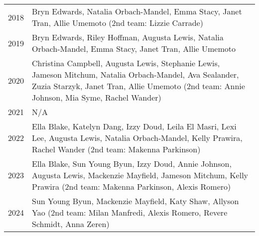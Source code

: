 \begin{longtable}{c p{}}
2018 & Bryn Edwards, Natalia Orbach-Mandel, Emma Stacy, Janet Tran, Allie Umemoto (2nd team: Lizzie Carrade) \\
2019 & Bryn Edwards, Riley Hoffman, Augusta Lewis, Natalia Orbach-Mandel, Emma Stacy, Janet Tran, Allie Umemoto \\
2020 & Christina Campbell, Augusta Lewis, Stephanie Lewis, Jameson Mitchum, Natalia Orbach-Mandel, Ava Sealander, Zuzia Starzyk, Janet Tran, Allie Umemoto (2nd team: Annie Johnson, Mia Syme, Rachel Wander) \\
2021 & N/A \\
2022 & Ella Blake, Katelyn Dang, Izzy Doud, Leila El Masri, Lexi Lee, Augusta Lewis, Natalia Orbach-Mandel, Kelly Prawira, Rachel Wander (2nd team: Makenna Parkinson) \\
2023 & Ella Blake, Sun Young Byun, Izzy Doud, Annie Johnson, Augusta Lewis, Mackenzie Mayfield, Jameson Mitchum, Kelly Prawira (2nd team: Makenna Parkinson, Alexis Romero) \\
2024 & Sun Young Byun, Mackenzie Mayfield, Katy Shaw, Allyson Yao (2nd team: Milan Manfredi, Alexis Romero, Revere Schmidt, Anna Zeren) \\
\bottomrule
\end{longtable}
    

    
